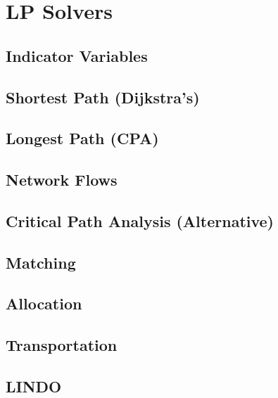 \documentclass[../maths.tex]{subfiles}
\begin{document}
\chapter{LP Solvers}
\section{Indicator Variables}
\section{Shortest Path (Dijkstra's)}
\section{Longest Path (CPA)}
\section{Network Flows}
\section{Critical Path Analysis (Alternative)}
\section{Matching}
\section{Allocation}
\section{Transportation}
\section{LINDO}
\end{document}
